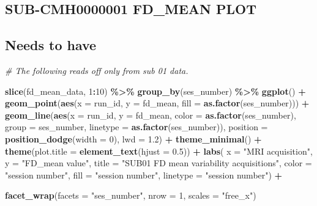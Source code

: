 \documentclass[
]{article}
\newenvironment{Shaded}{\begin{snugshade}}{\end{snugshade}}
\newcommand{\AttributeTok}[1]{\textcolor[rgb]{0.13,0.29,0.53}{#1}}
\newcommand{\CommentTok}[1]{\textcolor[rgb]{0.56,0.35,0.01}{\textit{#1}}}
\newcommand{\DecValTok}[1]{\textcolor[rgb]{0.00,0.00,0.81}{#1}}
\newcommand{\FloatTok}[1]{\textcolor[rgb]{0.00,0.00,0.81}{#1}}
\newcommand{\FunctionTok}[1]{\textcolor[rgb]{0.13,0.29,0.53}{\textbf{#1}}}
\newcommand{\NormalTok}[1]{#1}
\newcommand{\SpecialCharTok}[1]{\textcolor[rgb]{0.81,0.36,0.00}{\textbf{#1}}}
\newcommand{\StringTok}[1]{\textcolor[rgb]{0.31,0.60,0.02}{#1}}
\begin{document}
\subsection{SUB-CMH0000001 FD\_MEAN
PLOT}\label{sub-cmh0000001-fd_mean-plot}

\subsection{Needs to have}\label{needs-to-have}

\begin{Shaded}
\begin{Highlighting}[]
\CommentTok{\# The following reads off only from sub 01 data. }

\FunctionTok{slice}\NormalTok{(fd\_mean\_data, }\DecValTok{1}\SpecialCharTok{:}\DecValTok{10}\NormalTok{) }\SpecialCharTok{\%\textgreater{}\%}
  \FunctionTok{group\_by}\NormalTok{(ses\_number) }\SpecialCharTok{\%\textgreater{}\%}
    \FunctionTok{ggplot}\NormalTok{() }\SpecialCharTok{+} 
    \FunctionTok{geom\_point}\NormalTok{(}\FunctionTok{aes}\NormalTok{(}\AttributeTok{x =}\NormalTok{ run\_id, }\AttributeTok{y =}\NormalTok{ fd\_mean, }\AttributeTok{fill =} \FunctionTok{as.factor}\NormalTok{(ses\_number))) }\SpecialCharTok{+}
    \FunctionTok{geom\_line}\NormalTok{(}\FunctionTok{aes}\NormalTok{(}\AttributeTok{x =}\NormalTok{ run\_id, }\AttributeTok{y =}\NormalTok{ fd\_mean, }\AttributeTok{color =} \FunctionTok{as.factor}\NormalTok{(ses\_number), }
                  \AttributeTok{group =}\NormalTok{ ses\_number, }\AttributeTok{linetype =} \FunctionTok{as.factor}\NormalTok{(ses\_number)), }
              \AttributeTok{position =} \FunctionTok{position\_dodge}\NormalTok{(}\AttributeTok{width =} \DecValTok{0}\NormalTok{), }\AttributeTok{lwd =} \FloatTok{1.2}\NormalTok{) }\SpecialCharTok{+}
    \FunctionTok{theme\_minimal}\NormalTok{() }\SpecialCharTok{+}
    \FunctionTok{theme}\NormalTok{(}\AttributeTok{plot.title =} \FunctionTok{element\_text}\NormalTok{(}\AttributeTok{hjust =} \FloatTok{0.5}\NormalTok{)) }\SpecialCharTok{+}
    \FunctionTok{labs}\NormalTok{(}
    \AttributeTok{x =} \StringTok{"MRI acquisition"}\NormalTok{, }
    \AttributeTok{y =} \StringTok{"FD\_mean value"}\NormalTok{, }
    \AttributeTok{title =} \StringTok{"SUB01 FD mean variability acquisitions"}\NormalTok{,}
    \AttributeTok{color =} \StringTok{"session number"}\NormalTok{,}
    \AttributeTok{fill =} \StringTok{"session number"}\NormalTok{,}
    \AttributeTok{linetype =} \StringTok{"session number"}\NormalTok{) }\SpecialCharTok{+} 

    \FunctionTok{facet\_wrap}\NormalTok{(}\AttributeTok{facets =} \StringTok{"ses\_number"}\NormalTok{, }\AttributeTok{nrow =} \DecValTok{1}\NormalTok{, }\AttributeTok{scales =} \StringTok{"free\_x"}\NormalTok{) }
\end{Highlighting}
\end{Shaded}
\end{document}
